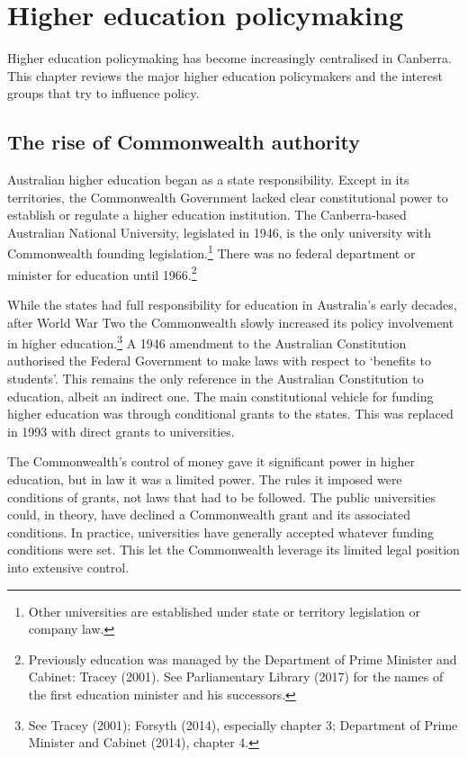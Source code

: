 \documentclass[]{book}
\begin{document}
\hypertarget{higher-education-policymaking}{%
\chapter{Higher education policymaking }\label{higher-education-policymaking}}

Higher education policymaking has become increasingly centralised in Canberra. This chapter reviews the major higher education policymakers and the interest groups that try to influence policy.

\hypertarget{the-rise-of-commonwealth-authority}{%
\section{The rise of Commonwealth authority}\label{the-rise-of-commonwealth-authority}}

Australian higher education began as a state responsibility. Except in its territories, the Commonwealth Government lacked clear constitutional power to establish or regulate a higher education institution. The Canberra-based Australian National University, legislated in 1946, is the only university with Commonwealth founding legislation.\footnote{Other universities are established under state or territory legislation or company law.} There was no federal department or minister for education until 1966.\footnote{Previously education was managed by the Department of Prime Minister and Cabinet: Tracey (2001). See Parliamentary Library (2017) for the names of the first education minister and his successors.}

While the states had full responsibility for education in Australia's early decades, after World War Two the Commonwealth slowly increased its policy involvement in higher education.\footnote{See Tracey (2001); Forsyth (2014), especially chapter 3; Department of Prime Minister and Cabinet (2014), chapter 4.} A 1946 amendment to the Australian Constitution authorised the Federal Government to make laws with respect to `benefits to students'. This remains the only reference in the Australian Constitution to education, albeit an indirect one. The main constitutional vehicle for funding higher education was through conditional grants to the states. This was replaced in 1993 with direct grants to universities.

The Commonwealth's control of money gave it significant power in higher education, but in law it was a limited power. The rules it imposed were conditions of grants, not laws that had to be followed. The public universities could, in theory, have declined a Commonwealth grant and its associated conditions. In practice, universities have generally accepted whatever funding conditions were set. This let the Commonwealth leverage its limited legal position into extensive control.
\end{document}
